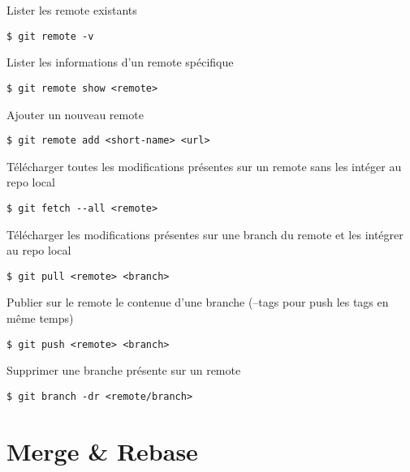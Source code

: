 \documentclass[jou,floatsintext]{apa6}
\begin{document}
Lister les remote existants
\begin{lstlisting}
$ git remote -v
\end{lstlisting} 
Lister les informations d'un remote spécifique
\begin{lstlisting}
$ git remote show <remote>
\end{lstlisting}
Ajouter un nouveau remote
\begin{lstlisting}
$ git remote add <short-name> <url>
\end{lstlisting}
Télécharger toutes les modifications présentes sur un remote sans les intéger au repo local
\begin{lstlisting}
$ git fetch --all <remote>
\end{lstlisting}
Télécharger les modifications présentes sur une branch du remote et les intégrer au repo local
\begin{lstlisting}
$ git pull <remote> <branch>
\end{lstlisting}
Publier sur le remote le contenue d'une branche (--tags pour push les tags en même temps)
\begin{lstlisting}
$ git push <remote> <branch> 
\end{lstlisting}
Supprimer une branche présente sur un remote
\begin{lstlisting}
$ git branch -dr <remote/branch>
\end{lstlisting}

\section{Merge \& Rebase}
\end{document}
